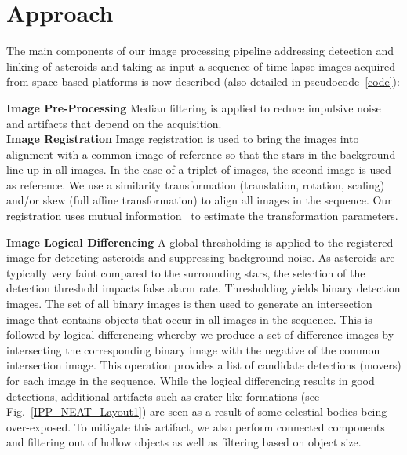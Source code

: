 \documentclass{article}
\begin{document}

\section{Approach}
\label{sec:approach}

The main components of our image processing pipeline addressing detection and linking of asteroids and taking as input a sequence of time-lapse images acquired from space-based platforms is now described  (also detailed in 
 pseudocode~\ref{code}):

\noindent
{\bf Image Pre-Processing} Median filtering is applied  to reduce impulsive noise and artifacts that depend on the acquisition.\\
{\bf Image Registration}
Image registration is used to bring the images into alignment with a common image of reference so that the stars in the background line up in all images.  In the case of a triplet of images, the second image is used as reference.  We use a similarity transformation (translation, rotation, scaling) and/or skew (full affine transformation) to align all images in the sequence.  Our registration uses mutual information~\cite{viola1997alignment} to estimate the transformation parameters.

{\bf Image Logical Differencing}
A global thresholding is applied to the registered image for detecting asteroids and suppressing background noise.  As asteroids are typically very faint compared to the surrounding stars, the selection of the detection threshold impacts false alarm rate.  Thresholding yields binary detection images.  The set of all binary images is then used to generate an intersection image that contains objects that occur in all images in the sequence.  This is followed by logical differencing whereby we produce a set of difference images by intersecting the corresponding binary image with the negative of the common intersection image.  This operation provides a list of candidate detections (movers) for each image in the sequence.  While the logical differencing results in good detections, additional artifacts such as crater-like formations (see Fig.~\ref{IPP_NEAT_Layout1}) are seen as a result of some celestial bodies being over-exposed.  To mitigate this artifact, we also perform connected components and filtering out of hollow objects as well as filtering based on object size.
\end{document}
